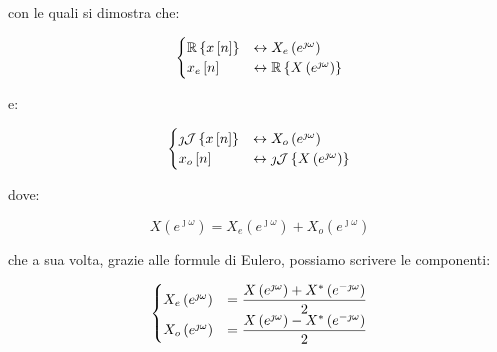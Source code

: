 con le quali si dimostra che: 

{
    \Large 
    \begin{equation}
        \setlength{\jot}{10pt} %
        \begin{cases}
        \mathbb{R} \left\{ x \left[ n\right]\right\} 
        &\leftrightarrow 
        X_e \left( e^{\jmath \omega}\right)
        \\
        x_e \left[ n\right] 
        &\leftrightarrow 
        \mathbb{R} \left\{ X \left( e^{\jmath \omega}\right)\right\}
        \end{cases}
    \end{equation}
}

e: 

{
    \Large 
    \begin{equation}
        \setlength{\jot}{10pt} %
        \begin{cases}
        \jmath \mathcal{J} \left\{ x \left[ n\right]\right\} 
        &\leftrightarrow 
        X_o \left( e^{\jmath \omega}\right)
        \\
        x_o \left[ n\right] 
        &\leftrightarrow 
        \jmath \mathcal{J} \left\{ X \left( e^{\jmath \omega}\right)\right\}
        \end{cases}
    \end{equation}
}

dove: 

{
    \Large 
    \begin{equation}
        X \left(e^{\jmath \omega }\right)
        = 
        X_e \left(e^{\jmath \omega}\right)
        +
        X_o \left(e^{\jmath \omega}\right) 
    \end{equation}
}

che a sua volta, grazie alle formule di Eulero, possiamo scrivere le componenti: 

{
    \Large 
    \begin{equation}
        \setlength{\jot}{10pt} %
        \begin{cases}
        X_e \left(e^{\jmath \omega}\right)
        &=
        \dfrac{X \left(e^{\jmath \omega}\right) + X^{*} \left(e^{-\jmath \omega}\right)}{2}  
        \\
        X_o \left(e^{\jmath \omega}\right)
        &=
        \dfrac{X \left(e^{\jmath \omega}\right) - X^{*} \left(e^{-\jmath \omega}\right)}{2}    
        \end{cases}
    \end{equation}
}

